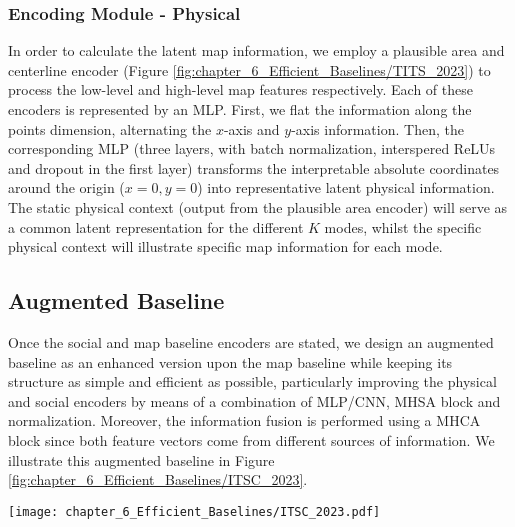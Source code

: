 \subsubsection{Encoding Module - Physical}
\label{subsubsec:6_efficient_baselines_encoding_map}

In order to calculate the latent map information, we employ a plausible area and centerline encoder (Figure \ref{fig:chapter_6_Efficient_Baselines/TITS_2023}) to process the low-level and high-level map features respectively. Each of these encoders is represented by an \ac{MLP}. First, we flat the information along the points dimension, alternating the $x$-axis and $y$-axis information. Then, the corresponding \ac{MLP} (three layers, with batch normalization, interspered \acp{ReLU} and dropout in the first layer) transforms the interpretable absolute coordinates around the origin ($x=0, y=0$) into representative latent physical information. The static physical context (output from the plausible area encoder) will serve as a common latent representation for the different $K$ modes, whilst the specific physical context will illustrate specific map information for each mode.

\subsection{Augmented Baseline}
\label{subsec:6_augmented_baseline}

Once the social and map baseline encoders are stated, we design an augmented baseline as an enhanced version upon the map baseline while keeping its structure as simple and efficient as possible, particularly improving the physical and social encoders by means of a combination of \ac{MLP}/\ac{CNN}, \ac{MHSA} block and normalization. Moreover, the information fusion is performed using a \ac{MHCA} block since both feature vectors come from different sources of information. We illustrate this augmented baseline in Figure \ref{fig:chapter_6_Efficient_Baselines/ITSC_2023}.

\begin{figure*}[!ht]
	\centering
	\setlength{\tabcolsep}{2.0pt}
	\texttt{[image: chapter\_6\_Efficient\_Baselines/ITSC\_2023.pdf]}
	\captionsetup{justification=justified}
	\caption[Augmented baseline with attention-based encoders and information fusion via cross-attention]{Augmented baseline with attention-based encoders and information fusion via cross-attention. Note that in this case we do not specifically differentiate between map and social information links since the augmented baseline uses both sources of information.}	
	\label{fig:chapter_6_Efficient_Baselines/ITSC_2023}
\end{figure*}

